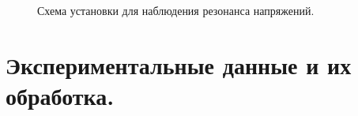 \documentclass[a4paper,12pt]{article} %
\begin{document}
\begin{figure}[H]
\noindent{}
\caption{Схема установки для наблюдения резонанса напряжений.}
\label{pic2:ref}
\end{figure}

\newpage

\section{Экспериментальные данные и их обработка.}
\end{document}
